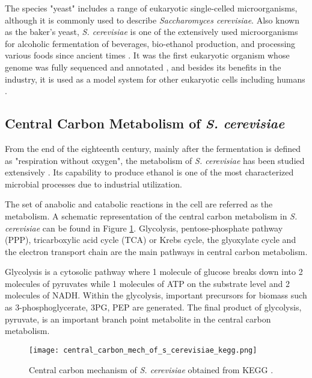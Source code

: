 The species "yeast" includes a range of eukaryotic single-celled microorganisms, although it is commonly used to describe \emph{Saccharomyces cerevisiae}. Also known as the baker's yeast, \emph{S. cerevisiae} is one of the extensively used microorganisms for alcoholic fermentation of beverages, bio-ethanol production, and processing various foods since ancient times \cite{gelinas2009inventions}. It was the first eukaryotic organism whose genome was fully sequenced and annotated \cite{goffeau1997multidrug}, and besides its benefits in the industry, it is used as a model system for other eukaryotic cells including humans \cite{dujon1996yeast, botstein1997yeast}.

\subsection{Central Carbon Metabolism of \emph{S. cerevisiae}}
From the end of the eighteenth century, mainly after the fermentation is defined as "respiration without oxygen", the metabolism of \emph{S. cerevisiae} has been studied extensively \cite{barnett1998history, barnett2000history}. Its capability to produce ethanol is one of the most characterized microbial processes due to industrial utilization.

The set of anabolic and catabolic reactions in the cell are referred as the metabolism. A schematic representation of the central carbon metabolism in \emph{S. cerevisiae} can be found in Figure \ref{fig:central_carbon_mech_of_s_cerevisiae_kegg}. Glycolysis, pentose-phosphate pathway (PPP), tricarboxylic acid cycle (TCA) or Krebs cycle, the glyoxylate cycle and the electron transport chain are the main pathways in central carbon metabolism.

Glycolysis is a cytosolic pathway where 1 molecule of glucose breaks down into 2 molecules of pyruvates while 1 molecules of ATP on the substrate level and 2 molecules of NADH. Within the glycolysis, important precursors for biomass such as 3-phosphoglycerate, 3PG, PEP are generated. The final product of glycolysis, pyruvate, is an important branch point metabolite in the central carbon metabolism.

 \begin{figure}[H]
 \texttt{[image: central\_carbon\_mech\_of\_s\_cerevisiae\_kegg.png]}
 \caption[Central carbon mechanism of \emph{S. cerevisiae}]{Central carbon mechanism of \emph{S. cerevisiae} obtained from  KEGG \cite{kanehisa2000kegg}.}
 \label{fig:central_carbon_mech_of_s_cerevisiae_kegg}
 \end{figure}

